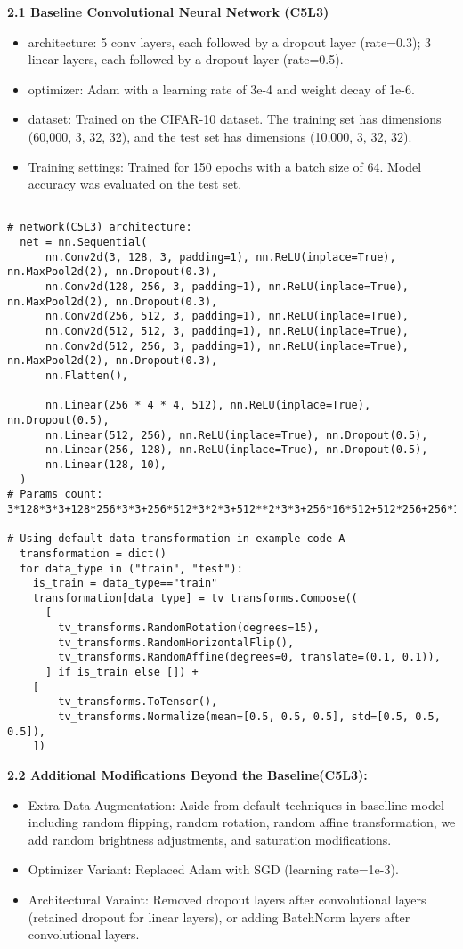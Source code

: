 \documentclass{article}
\begin{document}
\noindent \textbf{2.1 Baseline Convolutional Neural Network (C5L3) }
\begin{itemize}
  \item   architecture:  5 conv layers, each followed by a dropout layer (rate=0.3); 3 linear layers, each followed by a dropout layer (rate=0.5).
  \item   optimizer: Adam with a learning rate of 3e-4 and weight decay of 1e-6.
  \item   dataset: Trained on the CIFAR-10 dataset. The training set has dimensions (60,000, 3, 32, 32), and the test set has dimensions (10,000, 3, 32, 32).
  \item   Training settings: Trained for 150 epochs with a batch size of 64. Model accuracy was evaluated on the test set.
\end{itemize}  

\begin{verbatim}
  
# network(C5L3) architecture:  
  net = nn.Sequential(
      nn.Conv2d(3, 128, 3, padding=1), nn.ReLU(inplace=True), nn.MaxPool2d(2), nn.Dropout(0.3),
      nn.Conv2d(128, 256, 3, padding=1), nn.ReLU(inplace=True), nn.MaxPool2d(2), nn.Dropout(0.3),
      nn.Conv2d(256, 512, 3, padding=1), nn.ReLU(inplace=True),
      nn.Conv2d(512, 512, 3, padding=1), nn.ReLU(inplace=True),
      nn.Conv2d(512, 256, 3, padding=1), nn.ReLU(inplace=True), nn.MaxPool2d(2), nn.Dropout(0.3),
      nn.Flatten(),

      nn.Linear(256 * 4 * 4, 512), nn.ReLU(inplace=True), nn.Dropout(0.5),
      nn.Linear(512, 256), nn.ReLU(inplace=True), nn.Dropout(0.5),
      nn.Linear(256, 128), nn.ReLU(inplace=True), nn.Dropout(0.5),
      nn.Linear(128, 10),
  )
# Params count: 3*128*3*3+128*256*3*3+256*512*3*2*3+512**2*3*3+256*16*512+512*256+256*128+1280=7.28M

# Using default data transformation in example code-A
  transformation = dict()
  for data_type in ("train", "test"):
    is_train = data_type=="train"
    transformation[data_type] = tv_transforms.Compose((
      [
        tv_transforms.RandomRotation(degrees=15),
        tv_transforms.RandomHorizontalFlip(),
        tv_transforms.RandomAffine(degrees=0, translate=(0.1, 0.1)),
      ] if is_train else []) + 
    [
        tv_transforms.ToTensor(),
        tv_transforms.Normalize(mean=[0.5, 0.5, 0.5], std=[0.5, 0.5, 0.5]),
    ])
  \end{verbatim}

\noindent\textbf{2.2 Additional Modifications Beyond the Baseline(C5L3):}
\begin{itemize}
  \item Extra Data Augmentation: Aside from default techniques in baselline model including random flipping, random rotation, random affine transformation, we add random brightness adjustments, and saturation modifications.
  \item Optimizer Variant: Replaced Adam with SGD (learning rate=1e-3).
  \item Architectural Varaint: Removed dropout layers after convolutional layers (retained dropout for linear layers), or adding BatchNorm layers after convolutional layers.
\end{itemize}
\end{document}
